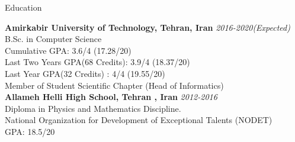 \documentclass{resume} %
\begin{document}

\begin{rSection}{Education}

{\bf  Amirkabir University of Technology, Tehran, Iran} \hfill {\em 2016-2020(Expected)} \\ 
B.Sc. in Computer Science\\
Cumulative GPA: 3.6/4 (17.28/20)\\
Last Two Years GPA(68 Credits): 3.9/4 (18.37/20)\\
Last Year GPA(32 Credits) : 4/4 (19.55/20)\\
Member of Student Scientific Chapter (Head of Informatics) \\

{\bf Allameh Helli High School, Tehran , Iran} \hfill {\em 2012-2016}\\ 
Diploma in Physics and Mathematics Discipline.\\
National Organization for Development of Exceptional Talents (NODET)\\
GPA: 18.5/20\\

\end{rSection}

\end{document}
